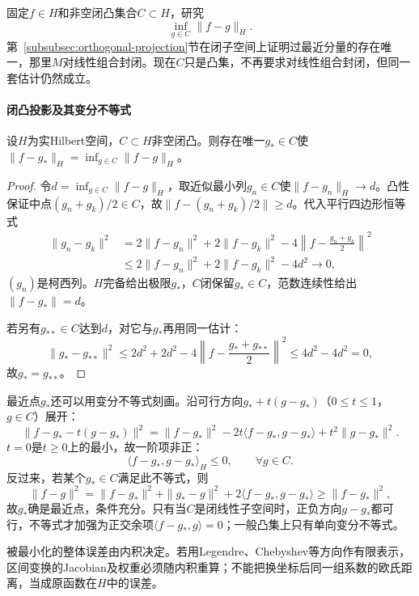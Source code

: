 固定$f\in H$和非空闭凸集合$C\subset H$，研究
\[
  \inf_{g\in C}\|f-g\|_H.
\]
第~\ref{subsubsec:orthogonal-projection}节在闭子空间上证明过最近分量的存在唯一，那里$M$对线性组合封闭。现在$C$只是凸集，不再要求对线性组合封闭，但同一套估计仍然成立。

\paragraph{闭凸投影及其变分不等式}

\begin{theorem}[闭凸集上的最近点]\label{thm:functional-closed-convex-projection}
设$H$为实Hilbert空间，$C\subset H$非空闭凸。则存在唯一$g_*\in C$使$\|f-g_*\|_H=\inf_{g\in C}\|f-g\|_H$。
\end{theorem}

\begin{proof}
令$d=\inf_{g\in C}\|f-g\|_H$，取近似最小列$g_n\in C$使$\|f-g_n\|_H\to d$。凸性保证中点$(g_n+g_k)/2\in C$，故$\|f-(g_n+g_k)/2\|\ge d$。代入平行四边形恒等式
\[
  \begin{aligned}
    \|g_n-g_k\|^2
    &=2\|f-g_n\|^2+2\|f-g_k\|^2
      -4\left\|f-\frac{g_n+g_k}{2}\right\|^2\\
    &\le2\|f-g_n\|^2+2\|f-g_k\|^2-4d^2\to0,
  \end{aligned}
\]
$(g_n)$是柯西列。$H$完备给出极限$g_*$，$C$闭保留$g_*\in C$，范数连续性给出$\|f-g_*\|=d$。

若另有$g_{**}\in C$达到$d$，对它与$g_*$再用同一估计：
\[
  \|g_*-g_{**}\|^2
  \le2d^2+2d^2-4\left\|f-\frac{g_*+g_{**}}2\right\|^2
  \le4d^2-4d^2=0,
\]
故$g_*=g_{**}$。
\end{proof}

最近点$g_*$还可以用变分不等式刻画。沿可行方向$g_*+t(g-g_*)$（$0\le t\le1$，$g\in C$）展开：
\[
  \|f-g_*-t(g-g_*)\|^2
  =\|f-g_*\|^2-2t\langle f-g_*,g-g_*\rangle+t^2\|g-g_*\|^2.
\]
$t=0$是$t\ge0$上的最小，故一阶项非正：
\begin{equation}
  \langle f-g_*,g-g_*\rangle_H\le0,\qquad\forall g\in C.
  \label{eq:functional-convex-projection-characterization}
\end{equation}
反过来，若某个$g_*\in C$满足此不等式，则
\[
  \|f-g\|^2=\|f-g_*\|^2+\|g_*-g\|^2+2\langle f-g_*,g-g_*\rangle
  \ge\|f-g_*\|^2,
\]
故$g_*$确是最近点，条件充分。只有当$C$是闭线性子空间时，正负方向$g-g_*$都可行，不等式才加强为正交余项$\langle f-g_*,g\rangle=0$；一般凸集上只有单向变分不等式。

被最小化的整体误差由内积决定。若用Legendre、Chebyshev等方向作有限表示，区间变换的Jacobian及权重必须随内积重算；不能把换坐标后同一组系数的欧氏距离，当成原函数在$H$中的误差。

